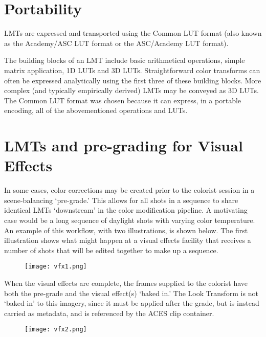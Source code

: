 \section{Portability}
LMTs are expressed and transported using the Common LUT format (also known as the Academy/ASC LUT format or the ASC/Academy LUT format).

The building blocks of an LMT include basic arithmetical operations, simple matrix application, 1D LUTs and 3D LUTs. Straightforward color transforms can often be expressed analytically using the first three of these building blocks. More complex (and typically empirically derived) LMTs may be conveyed as 3D LUTs. The Common LUT format was chosen because it can express, in a portable encoding, all of the abovementioned operations and LUTs.


\section{LMTs and pre-grading for Visual Effects}
In some cases, color corrections may be created prior to the colorist session in a scene-balancing `pre-grade.' This allows for all shots in a sequence to share identical LMTs `downstream' in the color modification pipeline. A motivating case would be a long sequence of daylight shots with varying color temperature.
An example of this workflow, with two illustrations, is shown below. The first illustration shows what might happen at a visual effects facility that receives a number of shots that will be edited together to make up a sequence.

\begin{figure}[H]
\begin{center}
    \texttt{[image: vfx1.png]}
\caption{}
\label{fig:vfx1}
\end{center}
\end{figure}

When the visual effects are complete, the frames supplied to the colorist have both the pre-grade and the visual effect(s) `baked in.' The Look Transform is not `baked in' to this imagery, since it must be applied after the grade, but is instead carried as metadata, and is referenced by the ACES clip container.

\begin{figure}[H]
\begin{center}
    \texttt{[image: vfx2.png]}
\caption{}
\label{fig:vfx2}
\end{center}
\end{figure}

